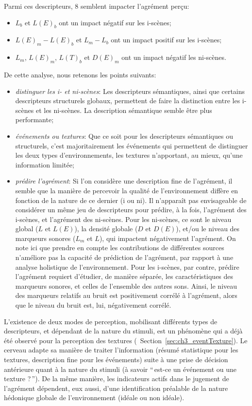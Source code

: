 Parmi ces descripteurs, 8 semblent impacter l'agrément perçu: 

\begin{itemize}
\item $L_b$ et $L(E)_b$ ont un impact négatif sur les i-scènes;
\item $L(E)_m-L(E)_b$ et $L_m-L_b$ ont un impact positif sur les i-scènes;
\item $L_m$, $L(E)_m$, $L(T)_b$ et $D(E)_m$ ont un impact négatif les ni-scènes.
\end{itemize}

De cette analyse, nous retenons les points suivants:

\begin{itemize}
\item \emph{distinguer les i- et ni-scènes}: Les descripteurs sémantiques, ainsi que certains descripteurs structurels globaux, permettent de faire la distinction entre les i-scènes et les ni-scènes. La description sémantique semble être plus performante;
\item \emph{événements ou textures}: Que ce soit pour les descripteurs sémantiques ou structurels, c'est majoritairement les événements qui permettent de distinguer les deux types d'environnements, les textures n'apportant, au mieux, qu'une information limitée;
\item \emph{prédire l'agrément}: Si l'on considère une description fine de l'agrément, il semble que la manière de percevoir la qualité de l'environnement diffère en fonction de la nature de ce dernier (i ou ni). Il n'apparaît pas envisageable de considérer un même jeu de descripteurs pour prédire, à la fois, l'agrément des i-scènes, et l'agrément des ni-scènes. Pour les ni-scènes, ce sont le niveau global ($L$ et $L(E)$), la densité globale ($D$ et $D(E)$), et/ou le niveau des marqueurs sonores ($L_m$ et $L$), qui impactent négativement l'agrément. On note ici que prendre en compte les contributions de différentes sources n'améliore pas la capacité de prédiction de l'agrément, par rapport à une analyse holistique de l'environnement. Pour les i-scènes, par contre, prédire l'agrément requiert d'étudier, de manière séparée, les caractéristiques des marqueurs sonores, et celles de l'ensemble des autres sons. Ainsi, le niveau des marqueurs relatifs au bruit est positivement corrélé à l'agrément, alors que le niveau du bruit est, lui, négativement corrélé.  
\end{itemize}

L'existence de deux modes de perception, mobilisant différents types de descripteurs, et dépendant de la nature du stimuli, est un phénomène qui a déjà été observé pour la perception des textures (\cf~Section~\ref{sec:ch3_eventTexture}). Le cerveau adapte sa manière de traiter l'information (résumé statistique pour les textures, description fine pour les événements) suite à une prise de décision antérieure quant à la nature du stimuli (à savoir ``\,est-ce un événement ou une texture ?\,''). De la même manière, les indicateurs actifs dans le jugement de l'agrément dépendent, eux aussi, d'une identification préalable de la nature hédonique globale de l'environnement (idéale ou non idéale).

